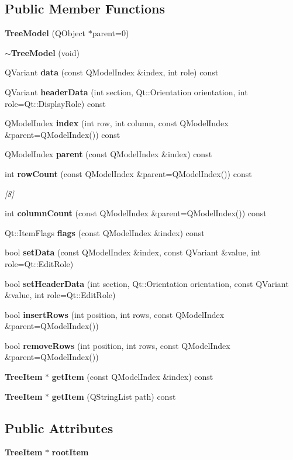 \subsection*{Public Member Functions}
\begin{CompactItemize}
\item 
{\bf Tree\-Model} (QObject $\ast$parent=0)
\item 
{\bf $\sim$Tree\-Model} (void)
\item 
QVariant {\bf data} (const QModel\-Index \&index, int role) const
\item 
QVariant {\bf header\-Data} (int section, Qt::Orientation orientation, int role=Qt::Display\-Role) const
\item 
QModel\-Index {\bf index} (int row, int column, const QModel\-Index \&parent=QModel\-Index()) const
\item 
QModel\-Index {\bf parent} (const QModel\-Index \&index) const
\item 
int {\bf row\-Count} (const QModel\-Index \&parent=QModel\-Index()) const
\begin{CompactList}\small\item\em [8] \item\end{CompactList}\item 
int {\bf column\-Count} (const QModel\-Index \&parent=QModel\-Index()) const
\item 
Qt::Item\-Flags {\bf flags} (const QModel\-Index \&index) const
\item 
bool {\bf set\-Data} (const QModel\-Index \&index, const QVariant \&value, int role=Qt::Edit\-Role)
\item 
bool {\bf set\-Header\-Data} (int section, Qt::Orientation orientation, const QVariant \&value, int role=Qt::Edit\-Role)
\item 
bool {\bf insert\-Rows} (int position, int rows, const QModel\-Index \&parent=QModel\-Index())
\item 
bool {\bf remove\-Rows} (int position, int rows, const QModel\-Index \&parent=QModel\-Index())
\item 
{\bf Tree\-Item} $\ast$ {\bf get\-Item} (const QModel\-Index \&index) const
\item 
{\bf Tree\-Item} $\ast$ {\bf get\-Item} (QString\-List path) const
\end{CompactItemize}
\subsection*{Public Attributes}
\begin{CompactItemize}
\item 
{\bf Tree\-Item} $\ast$ {\bf root\-Item}
\end{CompactItemize}


